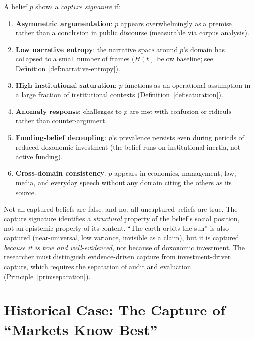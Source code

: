 \begin{definition}
\label{def:capture-signature}
A belief $p$ shows a \emph{capture signature} if:
\begin{enumerate}[nosep]
  \item \textbf{Asymmetric argumentation}: $p$ appears overwhelmingly as a premise rather than a conclusion in public discourse (measurable via corpus analysis).
  \item \textbf{Low narrative entropy}: the narrative space around $p$'s domain has collapsed to a small number of frames ($H(t)$ below baseline; see Definition~\ref{def:narrative-entropy}).
  \item \textbf{High institutional saturation}: $p$ functions as an operational assumption in a large fraction of institutional contexts (Definition~\ref{def:saturation}).
  \item \textbf{Anomaly response}: challenges to $p$ are met with confusion or ridicule rather than counter-argument.
  \item \textbf{Funding-belief decoupling}: $p$'s prevalence persists even during periods of reduced doxonomic investment (the belief runs on institutional inertia, not active funding).
  \item \textbf{Cross-domain consistency}: $p$ appears in economics, management, law, media, and everyday speech without any domain citing the others as its source.
\end{enumerate}
\end{definition}

\begin{remark}
Not all captured beliefs are false, and not all uncaptured beliefs are true.
The capture signature identifies a \emph{structural} property of the belief's social position, not an epistemic property of its content.
``The earth orbits the sun'' is also captured (near-universal, low variance, invisible as a claim), but it is captured \emph{because it is true and well-evidenced}, not because of doxonomic investment.
The researcher must distinguish evidence-driven capture from investment-driven capture, which requires the separation of audit and evaluation (Principle~\ref{prin:separation}).
\end{remark}


\section{Historical Case: The Capture of ``Markets Know Best''}
\label{sec:ch8-case}


